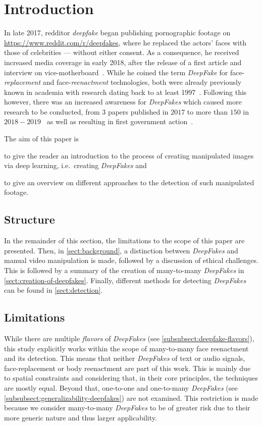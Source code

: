 \section{Introduction}
In late 2017, \gls{redditor} \textit{deepfake} began publishing pornographic footage
on \url{https://www.reddit.com/r/deepfakes}, where he replaced the actors' faces
with those of celebrities --- without either consent. As a consequence, he
received increased media coverage in early 2018, after the release of a first 
article and interview on vice-motherboard~\cite{Cole.2017}. While he coined the
term \textit{DeepFake} for face-\textit{replacement} and face-\textit{reenactment}
technologies, both were already previously known in academia with research 
dating back to at least 1997~\cite{Bregler.1997}.
Following this however, there was an increased awareness for \textit{DeepFakes}
which caused more research to be conducted, from \(3\) papers published in
\(2017\) to more than \(150\) in \(2018-2019\)~\cite{Mirsky.2020} as
well as resulting in first government action~\cite{senate_-_homeland_security_and_governmental_affairs_deepfake_2019}.

\par
The aim of this paper is
\begin{enumerate*}[a.)]
    \item to give the reader an introduction to the process of creating manipulated
    images via deep learning, i.e.\ creating \textit{DeepFakes} and
    \item to give an overview on different approaches to the detection of such
    manipulated footage.
\end{enumerate*}

\subsection{Structure}
In the remainder of this section, the limitations to the scope of this paper are
presented. Then, in \cref{sect:background}, a distinction between \textit{DeepFakes}
and manual video manipulation is made, followed by a discussion of ethical challenges.
This is followed by a summary of the creation of many-to-many \textit{DeepFakes}
in \cref{sect:creation-of-deepfakes}. Finally, different methods for detecting
\textit{DeepFakes} can be found in \cref{sect:detection}.

\subsection{Limitations}\label{subsect:limitations}
While there are multiple \textit{flavors} of \textit{DeepFakes} (see \cref{subsubsect:deepfake-flavors}),
this study explicitly works within the scope of many-to-many face reenactment and its
detection. This means that neither \textit{DeepFakes} of text or audio signals,
face-replacement or body reenactment are part of this work. This is mainly
due to spatial constraints and considering that, in their core principles, the
techniques are mostly equal. Beyond that, one-to-one and one-to-many
\textit{DeepFakes} (see \cref{subsubsect:generalizability-deepfakes}) are not
examined. This restriction is made because we consider many-to-many \textit{DeepFakes}
to be of greater risk due to their more generic nature and thus larger applicability.